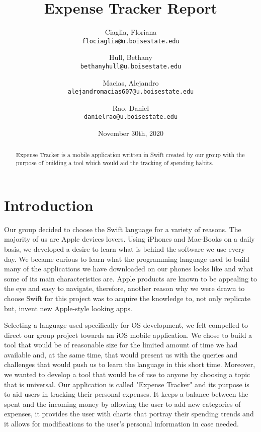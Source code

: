 \documentclass{article}
\title{\textbf{Expense Tracker Report}}
\author{ Ciaglia, Floriana\\ 
\texttt{flociaglia@u.boisestate.edu}
\and
Hull, Bethany\\
\texttt{bethanyhull@u.boisestate.edu}
\and
Macias, Alejandro\\ 
\texttt{alejandromacias607@u.boisestate.edu}
\and
Rao, Daniel\\
\texttt{danielrao@u.boisestate.edu}}
\date{November 30th, 2020}
\begin{document}
\maketitle

\begin{abstract}
 Expense Tracker is a mobile application written in Swift created by our group with the purpose of building a tool which would aid the tracking of spending habits. 

  \end{abstract}

  \section{Introduction}
  \label{sec:into}
 
  Our group decided to choose the Swift language for a variety of reasons. The majority of us are Apple devices lovers. Using iPhones and Mac-Books on a daily basis, we developed a desire to learn what is behind the software we use every day. We became curious to learn what the programming language used to build many of the applications we have downloaded on our phones looks like and what some of its main characteristics are. Apple products are known to be appealing to the eye and easy to navigate, therefore, another reason why we were drawn to choose Swift for this project was to acquire the knowledge to, not only replicate but, invent new Apple-style looking apps. \par
  
  \vskip 0.2in
 
  Selecting a language used specifically for OS development, we felt compelled to direct our group project towards an iOS mobile application. We chose to build a tool that would be of reasonable size for the limited amount of time we had available and, at the same time, that would present us with the queries and challenges that would push us to learn the language in this short time. Moreover, we wanted to develop a tool that would be of use to anyone by choosing a topic that is universal. Our application is called "Expense Tracker" and its purpose is to aid users in tracking their personal expenses. It keeps a balance between the spent and the incoming money by allowing the user to add new categories of expenses, it provides the user with charts that portray their spending trends and it allows for modifications to the user's personal information in case needed.  
  
  \vskip 0.2in
  
\end{document}
